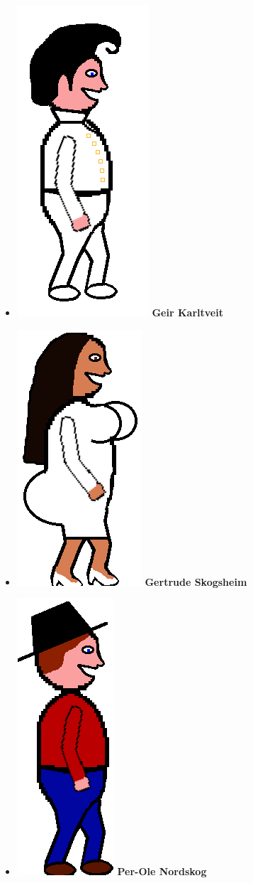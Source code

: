 \documentclass[paper=a4]{article}
\begin{document}
{\begin{itemize}
	\item \includegraphics[scale = 0.3]{images/elvis.png} \textbf{Geir Karltveit}
	\item \includegraphics[scale = 0.3]{images/kimk.png} \textbf{Gertrude Skogsheim}
	\item \includegraphics[scale = 0.3]{images/cowboy.png} \textbf{Per-Ole Nordskog}

\end{itemize}}
\end{document}
